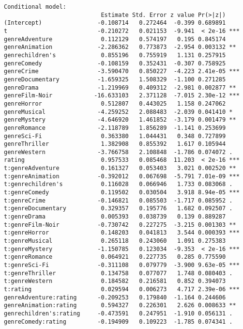 \begin{verbatim}
Conditional model:
                            Estimate Std. Error z value Pr(>|z|)
(Intercept)                -0.108714   0.272464  -0.399 0.689891
t                          -0.210272   0.021153  -9.941  < 2e-16 ***
genreAdventure              0.112129   0.574197   0.195 0.845174
genreAnimation             -2.286362   0.773873  -2.954 0.003132 **
genrechildren's             0.855196   0.755919   1.131 0.257915
genreComedy                -0.108159   0.352431  -0.307 0.758925
genreCrime                 -3.590470   0.850227  -4.223 2.41e-05 ***
genreDocumentary           -1.659325   1.508329  -1.100 0.271285
genreDrama                 -1.219969   0.409312  -2.981 0.002877 **
genreFilm-Noir            -16.633103   2.371128  -7.015 2.30e-12 ***
genreHorror                 0.512807   0.443025   1.158 0.247062
genreMusical               -4.259252   2.088483  -2.039 0.041410 *
genreMystery               -4.646920   1.461852  -3.179 0.001479 **
genreRomance               -2.118789   1.856289  -1.141 0.253699
genreSci-Fi                 0.363380   1.044431   0.348 0.727899
genreThriller               1.382908   0.855392   1.617 0.105944
genreWestern               -3.766758   2.108848  -1.786 0.074072 .
rating                      0.957533   0.085468  11.203  < 2e-16 ***
t:genreAdventure            0.161327   0.053403   3.021 0.002520 **
t:genreAnimation           -0.392012   0.067698  -5.791 7.01e-09 ***
t:genrechildren's           0.116028   0.066946   1.733 0.083068 .
t:genreComedy               0.119502   0.030504   3.918 8.94e-05 ***
t:genreCrime               -0.146821   0.085503  -1.717 0.085952 .
t:genreDocumentary          0.329357   0.195776   1.682 0.092507 .
t:genreDrama                0.005393   0.038739   0.139 0.889287
t:genreFilm-Noir           -0.730742   0.227275  -3.215 0.001303 **
t:genreHorror               0.148203   0.041813   3.544 0.000393 ***
t:genreMusical              0.265118   0.243060   1.091 0.275383
t:genreMystery             -1.150785   0.123034  -9.353  < 2e-16 ***
t:genreRomance              0.064921   0.227735   0.285 0.775590
t:genreSci-Fi              -0.311108   0.079779  -3.900 9.63e-05 ***
t:genreThriller             0.134758   0.077077   1.748 0.080403 .
t:genreWestern              0.184582   0.216581   0.852 0.394073
t:rating                    0.029594   0.006273   4.717 2.39e-06 ***
genreAdventure:rating      -0.209253   0.179840  -1.164 0.244606
genreAnimation:rating       0.594327   0.226301   2.626 0.008633 **
genrechildren's:rating     -0.473591   0.247951  -1.910 0.056131 .
genreComedy:rating         -0.194909   0.109223  -1.785 0.074341 .

\end{verbatim}
